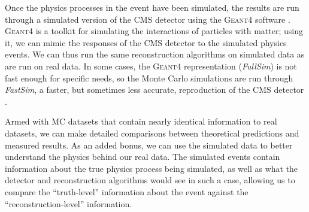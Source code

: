 Once the physics processes in the event have been simulated, the
results are run through a simulated version of the CMS detector using
the \textsc{Geant4} software \cite{geant}. \textsc{Geant4} is a
toolkit for simulating the interactions of particles with matter;
using it, we can mimic the responses of the CMS detector to the
simulated physics events. We can thus run the same reconstruction
algorithms on simulated data as are run on real data. In some cases,
the \textsc{Geant4} representation (\emph{FullSim}) is not fast enough
for specific needs, so the Monte Carlo simulations are run through
\emph{FastSim}, a faster, but sometimes less accurate, reproduction of
the CMS detector \cite{fastsim}.

Armed with MC datasets that contain nearly identical information to
real datasets, we can make detailed comparisons between theoretical
predictions and measured results. As an added bonus, we can use the
simulated data to better understand the physics behind our real
data. The simulated events contain information about the true physics
process being simulated, as well as what the detector and
reconstruction algorithms would see in such a case, allowing us to
compare the ``truth-level'' information about the event against the
``reconstruction-level'' information.

%
